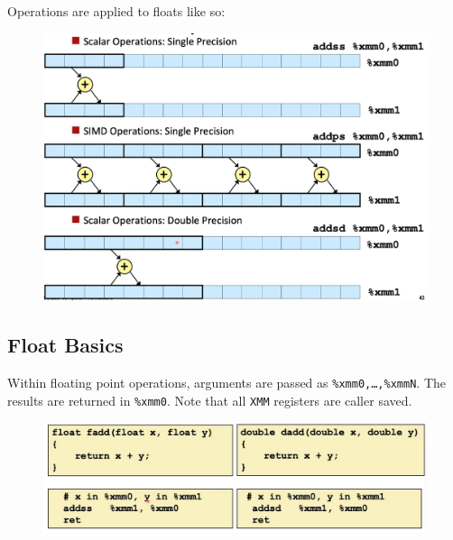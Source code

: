 \documentclass[12pt]{book}
\begin{document}
Operations are applied to floats like so:
\begin{figure}[h]
        \centering
        \includegraphics[scale = 0.4]{./figures/floatOps}
\end{figure}

\subsection*{Float Basics}
Within floating point operations, arguments are passed as \texttt{\%xmm0,\ldots,\%xmmN}.
The results are returned in \texttt{\%xmm0}.
Note that all \texttt{XMM} registers are caller saved.
\begin{figure}[h]
        \centering
        \includegraphics[scale = 0.3]{./figures/floatBasics}
\end{figure}
\end{document}
